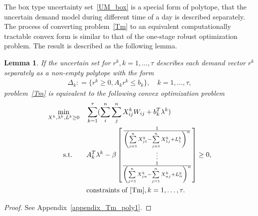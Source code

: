 \documentclass[10pt,twocolumn,twoside,english]{IEEEtran}
\newtheorem{lemma}{Lemma}
\begin{document}
The box type uncertainty set~\eqref{UM_box} is a special form of polytope, that the uncertain demand model during different time of a day is described separately. The process of converting problem~\eqref{Tm} to an equivalent computationally tractable convex form is similar to that of the one-stage robust optimization problem. The result is described as the following lemma.
\begin{lemma}
If the uncertain set for $r^k, k=1,\dots, \tau$ describes each demand vector $r^k$ separately as a non-empty polytope with the form
\begin{align}
\Delta_k: =\{ r^k \geq 0, A_k r^k \leq b_k\},\quad k=1,\dots, \tau,
\label{polytope}
\end{align} 
problem~\eqref{Tm} is equivalent to the following convex optimization problem
\begin{align}
\begin{split}
\underset{X^k,\lambda^k, L^k\geq 0}{\text{min}} \quad& \sum_{k=1}^{\tau}(\sum_{i}^n \sum_{j}^n X^k_{ij} W_{ij}+b_k^T\lambda^k )\\
\text{s.t.}\quad\quad &A_k^T\lambda^k-\beta\begin{bmatrix} \frac{1}{\left (\sum\limits_{j=1}^{n} X^k_{j1}-\sum\limits_{j=1}^{n} X^k_{1j} + L^k_1 \right)^{\alpha}} \\ \vdots \\ \frac{1}{\left (\sum\limits_{j=1}^{n} X^k_{jn}-\sum\limits_{j=1}^{n} X^k_{nj} + L^k_n \right)^{\alpha}}\end{bmatrix}    \geq 0, \\
&\text{constraints of~\eqref{Tm}}, k=1,\dots, \tau.
\end{split}
\label{conv_Tm}
\end{align}
\label{lemma_Tm_poly}
\end{lemma}
\begin{proof}
See Appendix~\ref{appendix_Tm_poly1}.
\end{proof}
\end{document}

